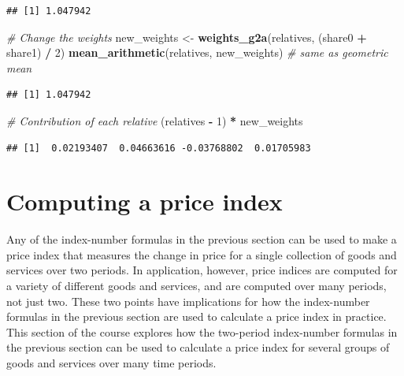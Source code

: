 \documentclass[]{article}
\newenvironment{Shaded}{\begin{snugshade}}{\end{snugshade}}
\newcommand{\CommentTok}[1]{\textcolor[rgb]{0.56,0.35,0.01}{\textit{#1}}}
\newcommand{\DecValTok}[1]{\textcolor[rgb]{0.00,0.00,0.81}{#1}}
\newcommand{\KeywordTok}[1]{\textcolor[rgb]{0.13,0.29,0.53}{\textbf{#1}}}
\newcommand{\NormalTok}[1]{#1}
\newcommand{\OperatorTok}[1]{\textcolor[rgb]{0.81,0.36,0.00}{\textbf{#1}}}
\newcommand{\StringTok}[1]{\textcolor[rgb]{0.31,0.60,0.02}{#1}}
\begin{document}
\begin{verbatim}
## [1] 1.047942
\end{verbatim}

\begin{Shaded}
\begin{Highlighting}[]
\CommentTok{# Change the weights}
\NormalTok{new_weights <-}\StringTok{ }\KeywordTok{weights_g2a}\NormalTok{(relatives, (share0 }\OperatorTok{+}\StringTok{ }\NormalTok{share1) }\OperatorTok{/}\StringTok{ }\DecValTok{2}\NormalTok{)}
\KeywordTok{mean_arithmetic}\NormalTok{(relatives, new_weights) }\CommentTok{# same as geometric mean}
\end{Highlighting}
\end{Shaded}

\begin{verbatim}
## [1] 1.047942
\end{verbatim}

\begin{Shaded}
\begin{Highlighting}[]
\CommentTok{# Contribution of each relative}
\NormalTok{(relatives }\OperatorTok{-}\StringTok{ }\DecValTok{1}\NormalTok{) }\OperatorTok{*}\StringTok{ }\NormalTok{new_weights}
\end{Highlighting}
\end{Shaded}

\begin{verbatim}
## [1]  0.02193407  0.04663616 -0.03768802  0.01705983
\end{verbatim}

\hypertarget{computing-a-price-index}{%
\section{Computing a price index}\label{computing-a-price-index}}

Any of the index-number formulas in the previous section can be used to make a price index that measures the change in price for a single collection of goods and services over two periods. In application, however, price indices are computed for a variety of different goods and services, and are computed over many periods, not just two. These two points have implications for how the index-number formulas in the previous section are used to calculate a price index in practice. This section of the course explores how the two-period index-number formulas in the previous section can be used to calculate a price index for several groups of goods and services over many time periods.
\end{document}
